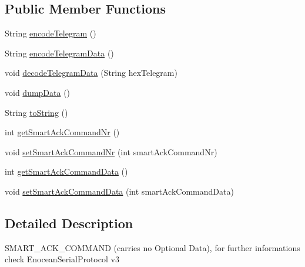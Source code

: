 \subsection*{Public Member Functions}
\begin{DoxyCompactItemize}
\item 
String \hyperlink{classch_1_1bfh_1_1gr33nopo55um_1_1enocean_1_1telegram_1_1_smart_ack_command_ab75879e83985751c0a5c8f784a0fb796}{encode\+Telegram} ()
\item 
String \hyperlink{classch_1_1bfh_1_1gr33nopo55um_1_1enocean_1_1telegram_1_1_smart_ack_command_ab56598b5a3276916895d43120b4fe465}{encode\+Telegram\+Data} ()
\item 
void \hyperlink{classch_1_1bfh_1_1gr33nopo55um_1_1enocean_1_1telegram_1_1_smart_ack_command_a09d57332bda75a1af7f352b8af15620a}{decode\+Telegram\+Data} (String hex\+Telegram)
\item 
void \hyperlink{classch_1_1bfh_1_1gr33nopo55um_1_1enocean_1_1telegram_1_1_smart_ack_command_ad9c443c462ce590c1f8c1fb81b30f9ec}{dump\+Data} ()
\item 
String \hyperlink{classch_1_1bfh_1_1gr33nopo55um_1_1enocean_1_1telegram_1_1_smart_ack_command_a5f55a2d85825726777f32021c2595d9c}{to\+String} ()
\item 
int \hyperlink{classch_1_1bfh_1_1gr33nopo55um_1_1enocean_1_1telegram_1_1_smart_ack_command_aa905bf545db04f358813cd12a3e628c7}{get\+Smart\+Ack\+Command\+Nr} ()
\item 
void \hyperlink{classch_1_1bfh_1_1gr33nopo55um_1_1enocean_1_1telegram_1_1_smart_ack_command_aaec21c63d8ba444d455fab8c767854e0}{set\+Smart\+Ack\+Command\+Nr} (int smart\+Ack\+Command\+Nr)
\item 
int \hyperlink{classch_1_1bfh_1_1gr33nopo55um_1_1enocean_1_1telegram_1_1_smart_ack_command_aed09fa831f87270405779ccc8f549edd}{get\+Smart\+Ack\+Command\+Data} ()
\item 
void \hyperlink{classch_1_1bfh_1_1gr33nopo55um_1_1enocean_1_1telegram_1_1_smart_ack_command_acff116efb348e515556a88dd06858f9b}{set\+Smart\+Ack\+Command\+Data} (int smart\+Ack\+Command\+Data)
\end{DoxyCompactItemize}


\subsection{Detailed Description}
S\+M\+A\+R\+T\+\_\+\+A\+C\+K\+\_\+\+C\+O\+M\+M\+A\+ND (carries no Optional Data), for further informations check Enocean\+Serial\+Protocol v3

